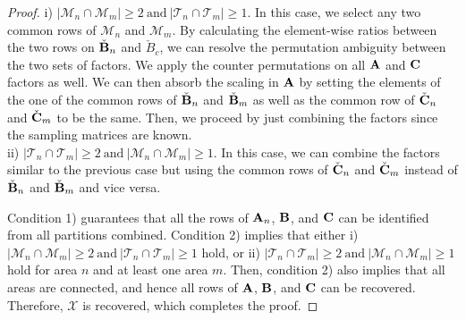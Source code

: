 \documentclass[journal]{IEEEtran}
\newcommand{\A}{{\bf A}}
\newcommand{\B}{{\bf B}}
\newcommand{\C}{{\bf C}}
\newcommand{\Ten}[1]{\mathcal{#1}}
\begin{document}
{\begin{proof}
i) $|\mathcal{M}_n\cap \mathcal{M}_m|\geq 2 \ \text{and}\  |\mathcal{T}_n\cap \mathcal{T}_m|\geq 1$. In this case, we select any two common rows of $\mathcal{M}_n$ and $\mathcal{M}_m$. By calculating the element-wise ratios between the two rows on $\check{\B}_n$ and $\check{B}_c$, we can resolve the permutation ambiguity between the two sets of factors. We apply the counter permutations on all $\A$ and $\C$ factors as well. We can then absorb the scaling in $\A$ by setting the elements of the one of the common rows of $\check{\B}_n$ and $\check{\B}_m$ as well as the common row of $\check{\C}_n$ and $\check{\C}_m$ to be the same. Then, we proceed by just combining the factors since the sampling matrices are known.\\
ii) $|\mathcal{T}_n\cap \mathcal{T}_m|\geq 2 \ \text{and}\  |\mathcal{M}_n\cap \mathcal{M}_m|\geq 1$. In this case, we can combine the factors similar to the previous case but using the common rows of $\check{\C}_n$ and $\check{\C}_m$ instead of $\check{\B}_n$ and $\check{\B}_m$ and vice versa.

Condition 1) guarantees that all the rows of $\A_n$, $\B$, and $\C$ can be identified from all partitions combined. Condition 2) implies that either i) $|\mathcal{M}_n\cap \mathcal{M}_m|\geq 2 \ \text{and}\  |\mathcal{T}_n\cap \mathcal{T}_m|\geq 1$ hold, or ii) $|\mathcal{T}_n\cap \mathcal{T}_m|\geq 2 \ \text{and}\  |\mathcal{M}_n\cap \mathcal{M}_m|\geq 1$ hold for area $n$ and at least one area $m$. Then, condition 2) also implies that all areas are connected, and hence all  rows of $\A$, $\B$, and $\C$ can be recovered. Therefore, $\Ten{X}$ is recovered, which completes the proof.
\end{proof}
}
\end{document}
